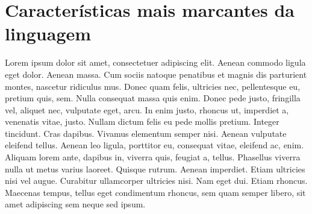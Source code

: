 \chapter{Características mais marcantes da linguagem}

  Lorem ipsum dolor sit amet, consectetuer adipiscing 
  elit. Aenean commodo ligula eget dolor. Aenean massa.
  Cum sociis natoque penatibus et magnis dis parturient
  montes, nascetur ridiculus mus. Donec quam felis, 
  ultricies nec, pellentesque eu, pretium quis, sem. 
  Nulla consequat massa quis enim. Donec pede justo, 
  fringilla vel, aliquet nec, vulputate eget, arcu. In 
  enim justo, rhoncus ut, imperdiet a, venenatis vitae,
  justo. Nullam dictum felis eu pede mollis pretium. 
  Integer tincidunt. Cras dapibus. Vivamus elementum 
  semper nisi. Aenean vulputate eleifend tellus. Aenean 
  leo ligula, porttitor eu, consequat vitae, eleifend 
  ac, enim. Aliquam lorem ante, dapibus in, viverra 
  quis, feugiat a, tellus. Phasellus viverra nulla ut 
  metus varius laoreet. Quisque rutrum. Aenean imperdiet.
  Etiam ultricies nisi vel augue. Curabitur ullamcorper 
  ultricies nisi. Nam eget dui. Etiam rhoncus. Maecenas 
  tempus, tellus eget condimentum rhoncus, sem quam 
  semper libero, sit amet adipiscing sem neque sed ipsum.

\newpage
